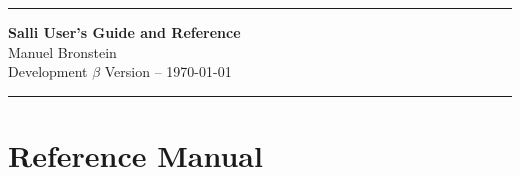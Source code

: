 \documentclass{article}
\begin{document}
\thispagestyle{empty}
\begin{center}
\vskip 5cm
\hrule
\vskip 0.5cm
{\LARGE\bf Salli User's Guide and Reference}\\
\vskip 1cm
{\Large Manuel Bronstein}\\
\vskip 1cm
{\Large Development $\beta$ Version -- \today}
\vskip 0.5cm
\hrule
\end{center}
\newpage

\tableofcontents

\newpage

\section{Reference Manual}
\end{document}
